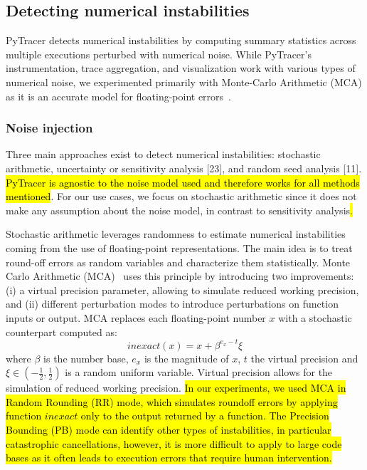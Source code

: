 \documentclass[10pt,journal,compsoc]{IEEEtran}
\newcommand{\pytracer}[0]{PyTracer\xspace}
\DeclareRobustCommand{\add}[1]{\sethlcolor{lightgreen}\hl{#1}}
\DeclareRobustCommand{\addCite}[1]{\textcolor{lightgreen}{\mbox{#1}}}
\DeclareRobustCommand{\add}[1]{#1}
\DeclareRobustCommand{\addCite}[1]{#1}
\begin{document}
\subsection{Detecting numerical instabilities}

\pytracer detects numerical instabilities by computing summary statistics across
multiple executions perturbed with numerical noise. While \pytracer's
instrumentation, trace aggregation, and visualization work with various types of
numerical noise, we experimented primarily with Monte-Carlo Arithmetic (MCA) as
it is an accurate model for floating-point errors~\addCite{\cite{verificarlo}}.

\subsubsection{Noise injection}
\label{sec:fuzzy}

Three  main  approaches  exist  to  detect  numerical  instabilities:
stochastic  arithmetic,  uncertainty  or  sensitivity analysis [23], and random
seed analysis [11].  \add{PyTracer is agnostic to the noise model used and therefore
    works for all methods mentioned}.  For our use cases, we focus on stochastic
arithmetic since it does not make any assumption about the noise model, in
contrast to sensitivity analysis\add{.}

Stochastic arithmetic leverages randomness to estimate numerical instabilities
coming from the use of floating-point representations. The main idea is to treat
round-off errors as random variables and characterize them statistically. Monte 
Carlo Arithmetic (MCA)~\cite{parker1997monte} uses this principle by introducing
two improvements: (i) a virtual precision parameter, allowing to simulate
reduced working precision, and (ii) different perturbation modes to introduce
perturbations on function inputs or output. MCA replaces each floating-point
number $x$ with a stochastic counterpart computed as:
\[
    inexact(x) =  x + \beta^{e_x - t}\xi
\]
where $\beta$ is the number base, $e_x$ is the magnitude of $x$, $t$ the virtual
precision and $\xi \in (-\frac{1}{2},\frac{1}{2})$ is a random uniform variable.
Virtual precision allows for the simulation of reduced working precision.
\add{In our experiments, we used MCA in Random Rounding (RR) mode, which
    simulates roundoff errors by applying function $inexact$ only to the
    output returned by a function. The Precision Bounding (PB) mode can
    identify other types of instabilities, in particular catastrophic
    cancellations, however, it is more difficult to apply to large code bases
    as it often leads to execution errors that require human intervention.}
\end{document}
